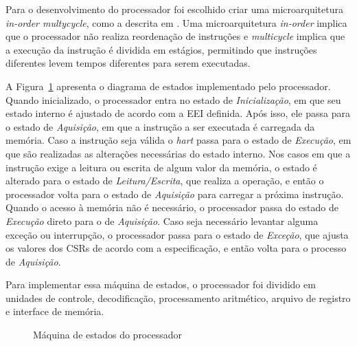 Para o desenvolvimento do processador foi escolhido criar uma microarquitetura \emph{in-order multycycle}, como a
descrita em \cite{harris2021digital}. Uma microarquitetura \emph{in-order} implica que o processador
não realiza reordenação de instruções e \emph{multicycle} implica que a execução da instrução é dividida em
estágios, permitindo que instruções diferentes levem tempos diferentes para serem executadas.

A Figura~\ref{fig:pstm} apresenta o diagrama de estados implementado pelo processador. Quando inicializado, o
processador entra no estado de \emph{Inicialização}, em que seu estado interno é ajustado de acordo com
a EEI definida. Após isso, ele passa para o estado de \emph{Aquisição}, em que a instrução a ser executada é
carregada da memória. Caso a instrução seja válida o \emph{hart} passa para o estado de \emph{Execução}, em que
são realizadas as alterações necessárias do estado interno. Nos casos em que a instrução
exige a leitura ou escrita de algum valor da memória, o estado é alterado para o estado de
\emph{Leitura/Escrita}, que realiza a operação, e então o processador volta para o estado de \emph{Aquisição}
para carregar a próxima instrução. Quando o acesso à memória não é necessário, o processador passa do estado de
\emph{Execução} direto para o de \emph{Aquisição}.
Caso seja necessário levantar alguma exceção ou interrupção, o processador passa para o estado de \emph{Exceção}, que
ajusta os valores dos CSRs de acordo com a especificação, e então volta para o processo de \emph{Aquisição}.

Para implementar essa máquina de estados, o processador foi dividido em unidades de controle, decodificação,
processamento aritmético, arquivo de registro e interface de memória.

\begin{figure}
  \centering
  \caption{Máquina de estados do processador}\label{fig:pstm}
\end{figure}

